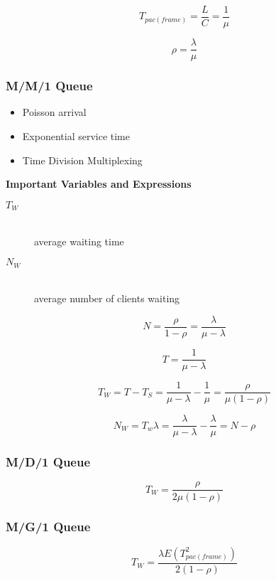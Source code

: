 \documentclass[../resumosRCOM.tex]{subfiles}
\begin{document}
\begin{equation}
    T_{pac(frame)} = \frac{L}{C} = \frac{1}{\mu}
\end{equation}

\begin{equation}
    \rho = \frac{\lambda}{\mu}
\end{equation}

\subsubsection{M/M/1 Queue}

\begin{itemize}
    \item Poisson arrival
    \item Exponential service time
    \item Time Division Multiplexing
\end{itemize}

\textbf{Important Variables and Expressions}
\begin{description}
    \item[\(T_{W}\)] \hfill \\ average waiting time
    \item[\(N_{W}\)] \hfill \\ average number of clients waiting
\end{description}

\begin{equation}
    N = \frac{\rho}{1-\rho} = \frac{\lambda}{\mu-\lambda}
\end{equation}

\begin{equation}
    T = \frac{1}{\mu-\lambda}
\end{equation}

\begin{equation}
    T_{W} = T - T_{S} = \frac{1}{\mu-\lambda} - \frac{1}{\mu} = \frac{\rho}{\mu(1-\rho)}
\end{equation}

\begin{equation}
    N_{W} = T_{w}\lambda = \frac{\lambda}{\mu-\lambda} - \frac{\lambda}{\mu} = N - \rho
\end{equation}

\subsubsection{M/D/1 Queue}

\begin{equation}
    T_{W} = \frac{\rho}{2\mu(1-\rho)}
\end{equation}

\subsubsection{M/G/1 Queue}

\begin{equation}
    T_{W} = \frac{\lambda E(T_{pac(frame)}^2)}{2(1-\rho)}
\end{equation}
\end{document}
